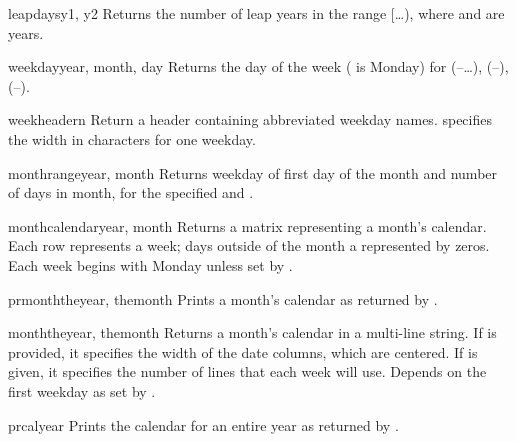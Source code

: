 \begin{funcdesc}{leapdays}{y1, y2}
Returns the number of leap years in the range
[\ldots{}), where  and  are years.
\end{funcdesc}

\begin{funcdesc}{weekday}{year, month, day}
Returns the day of the week ( is Monday) for 
(--\ldots),  (--), 
(--).
\end{funcdesc}

\begin{funcdesc}{weekheader}{n}
Return a header containing abbreviated weekday names.  specifies
the width in characters for one weekday.
\end{funcdesc}

\begin{funcdesc}{monthrange}{year, month}
Returns weekday of first day of the month and number of days in month, 
for the specified  and .
\end{funcdesc}

\begin{funcdesc}{monthcalendar}{year, month}
Returns a matrix representing a month's calendar.  Each row represents
a week; days outside of the month a represented by zeros.
Each week begins with Monday unless set by .
\end{funcdesc}

\begin{funcdesc}{prmonth}{theyear, themonth}
Prints a month's calendar as returned by .
\end{funcdesc}

\begin{funcdesc}{month}{theyear, themonth}
Returns a month's calendar in a multi-line string. If  is
provided, it specifies the width of the date columns, which are
centered. If  is given, it specifies the number of lines that
each week will use. Depends on the first weekday as set by
.
\end{funcdesc}

\begin{funcdesc}{prcal}{year}
Prints the calendar for an entire year as returned by 
.
\end{funcdesc}

